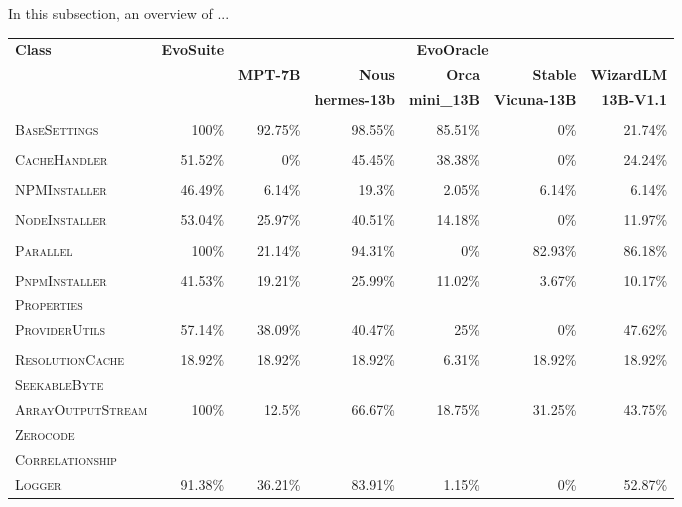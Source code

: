 In this subsection, an overview of ...




\begin{table}[H]
\centering

\begin{tabular}{| l | r | r | r | r | r | r |}
\hline
\multirow{2}{*}{\textbf{Class}} & \multirow{2}{*}{\textbf{EvoSuite}} & \multicolumn{5}{c|}{\textbf{EvoOracle}} \\ %
\cline{3-7} %
 &  & \textbf{MPT-7B} & \textbf{Nous} & \textbf{Orca} & \textbf{Stable} & \textbf{WizardLM} \\
 &  &  & \textbf{hermes-13b} & \textbf{mini\_13B} & \textbf{Vicuna-13B} & \textbf{13B-V1.1} \\
\hline
\scriptsize\textsc{} &  &  &  &  &  &  \\
\scriptsize\textsc{BaseSettings} & 100\% & 92.75\% & 98.55\% & 85.51\% & 0\% & 21.74\% \\
\hline
\scriptsize\textsc{} &  &  &  &  &  &  \\
\scriptsize\textsc{CacheHandler} & 51.52\% & 0\% & 45.45\% & 38.38\% & 0\% & 24.24\% \\
\hline
\scriptsize\textsc{} &  &  &  &  &  &  \\
\scriptsize\textsc{NPMInstaller} & 46.49\% & 6.14\% & 19.3\% & 2.05\% & 6.14\% & 6.14\% \\
\hline
\scriptsize\textsc{} &  &  &  &  &  &  \\
\scriptsize\textsc{NodeInstaller} & 53.04\% & 25.97\% & 40.51\% & 14.18\% & 0\% & 11.97\% \\
\hline
\scriptsize\textsc{} &  &  &  &  &  &  \\
\scriptsize\textsc{Parallel} & 100\% & 21.14\% & 94.31\% & 0\% & 82.93\% & 86.18\% \\
\hline
\scriptsize\textsc{} &  &  &  &  &  &  \\
\scriptsize\textsc{PnpmInstaller} & 41.53\% & 19.21\% & 25.99\% & 11.02\% & 3.67\% & 10.17\% \\
\hline
\scriptsize\textsc{Properties} &  &  &  &  &  &  \\
\scriptsize\textsc{ProviderUtils} & 57.14\% & 38.09\% & 40.47\% & 25\% & 0\% & 47.62\% \\
\hline
\scriptsize\textsc{} &  &  &  &  &  &  \\
\scriptsize\textsc{ResolutionCache} & 18.92\% & 18.92\% & 18.92\% & 6.31\% & 18.92\% & 18.92\% \\
\hline
\scriptsize\textsc{SeekableByte} &  &  &  &  &  &  \\
\scriptsize\textsc{ArrayOutputStream} & 100\% & 12.5\% & 66.67\% & 18.75\% & 31.25\% & 43.75\% \\
\hline
\scriptsize\textsc{Zerocode} &  &  &  &  &  &  \\
\scriptsize\textsc{Correlationship} &  &  &  &  &  &  \\
\scriptsize\textsc{Logger} & 91.38\% & 36.21\% & 83.91\% & 1.15\% & 0\% & 52.87\% \\
\hline


\end{tabular}
\end{table}
